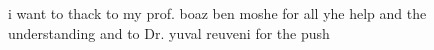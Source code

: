 \clearpage
{}

\begin{acknowledgements}

i want to thack to my prof. boaz ben moshe for all yhe help and the understanding 
and to Dr. yuval reuveni for the push 

\end{acknowledgements}